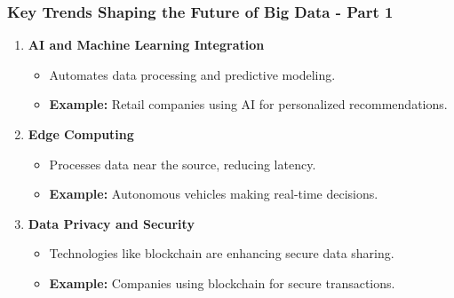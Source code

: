 \documentclass[aspectratio=169]{beamer}
\begin{document}
\begin{frame}[fragile]
    \frametitle{Key Trends Shaping the Future of Big Data - Part 1}
    \begin{enumerate}
        \item \textbf{AI and Machine Learning Integration}
          \begin{itemize}
              \item Automates data processing and predictive modeling.
              \item \textbf{Example:} Retail companies using AI for personalized recommendations.
          \end{itemize}
          
        \item \textbf{Edge Computing}
          \begin{itemize}
              \item Processes data near the source, reducing latency.
              \item \textbf{Example:} Autonomous vehicles making real-time decisions.
          \end{itemize}
          
        \item \textbf{Data Privacy and Security}
          \begin{itemize}
              \item Technologies like blockchain are enhancing secure data sharing.
              \item \textbf{Example:} Companies using blockchain for secure transactions.
          \end{itemize}
    \end{enumerate}
\end{frame}
\end{document}
